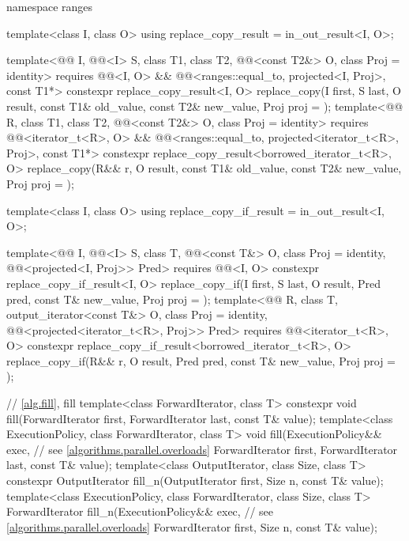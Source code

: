 \begin{codeblock}
{  namespace ranges {
    template<class I, class O>
      using replace_copy_result = in_out_result<I, O>;

    template<@@ I, @@<I> S, class T1, class T2,
             @@<const T2&> O, class Proj = identity>
      requires @@<I, O> &&
               @@<ranges::equal_to, projected<I, Proj>, const T1*>
      constexpr replace_copy_result<I, O>
        replace_copy(I first, S last, O result, const T1& old_value, const T2& new_value,
                     Proj proj = {});
    template<@@ R, class T1, class T2, @@<const T2&> O,
             class Proj = identity>
      requires @@<iterator_t<R>, O> &&
               @@<ranges::equal_to,
                                         projected<iterator_t<R>, Proj>, const T1*>
      constexpr replace_copy_result<borrowed_iterator_t<R>, O>
        replace_copy(R&& r, O result, const T1& old_value, const T2& new_value,
                     Proj proj = {});

    template<class I, class O>
      using replace_copy_if_result = in_out_result<I, O>;

    template<@@ I, @@<I> S, class T, @@<const T&> O,
             class Proj = identity, @@<projected<I, Proj>> Pred>
      requires @@<I, O>
      constexpr replace_copy_if_result<I, O>
        replace_copy_if(I first, S last, O result, Pred pred, const T& new_value,
                        Proj proj = {});
    template<@@ R, class T, output_iterator<const T&> O, class Proj = identity,
             @@<projected<iterator_t<R>, Proj>> Pred>
      requires @@<iterator_t<R>, O>
      constexpr replace_copy_if_result<borrowed_iterator_t<R>, O>
        replace_copy_if(R&& r, O result, Pred pred, const T& new_value,
                        Proj proj = {});
  }

  // \ref{alg.fill}, fill
  template<class ForwardIterator, class T>
    constexpr void fill(ForwardIterator first, ForwardIterator last, const T& value);
  template<class ExecutionPolicy, class ForwardIterator, class T>
    void fill(ExecutionPolicy&& exec,                           // see \ref{algorithms.parallel.overloads}
              ForwardIterator first, ForwardIterator last, const T& value);
  template<class OutputIterator, class Size, class T>
    constexpr OutputIterator fill_n(OutputIterator first, Size n, const T& value);
  template<class ExecutionPolicy, class ForwardIterator,
           class Size, class T>
    ForwardIterator fill_n(ExecutionPolicy&& exec,              // see \ref{algorithms.parallel.overloads}
                           ForwardIterator first, Size n, const T& value);

}
\end{codeblock}
